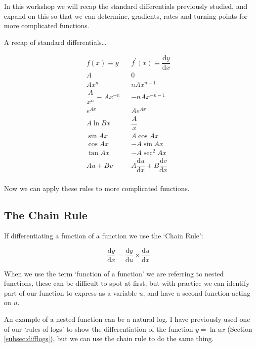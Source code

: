 \documentclass[
]{book}
\begin{document}
In this workshop we will recap the standard differentials previously studied, and expand on this so that we can determine, gradients, rates and turning points for more complicated functions.

A recap of standard differentials\ldots{}

\begin{equation*}
\begin{array}{ccc}
  f(x) \equiv y & & f^{\prime}(x) \equiv \dfrac{\textrm{d}y}{\textrm{d}x}\\
  \hline
A & &0 \\
 Ax^n & &nAx^{n-1} \\
 \dfrac{A}{x^n} \equiv A x^{-n} & &-nA x^{-n-1} \\
e^{Ax} & &Ae^{Ax} \\
A \ln Bx & &\dfrac{A}{x} \\
\sin Ax & &A\cos Ax \\
\cos Ax & &-A\sin Ax \\
\tan Ax & &-A\sec^2 Ax \\
Au + Bv & &A\dfrac{\textrm{d}u}{\textrm{d}x} + B\dfrac{\textrm{d}v}{\textrm{d}x} \\
\end{array}
\end{equation*}

Now we can apply these rules to more complicated functions.

\hypertarget{subsec:chainrule}{%
\subsection{The Chain Rule}\label{subsec:chainrule}}

If differentiating a function of a function we use the `Chain Rule':

\begin{equation}
\dfrac{\textrm{d}y}{\textrm{d}x}=\dfrac{\textrm{d}y}{\textrm{d}u} \times \dfrac{\textrm{d}u}{\textrm{d}x}
\label{eq:chainrule}
\end{equation}

When we use the term `function of a function' we are referring to nested functions, these can be difficult to spot at first, but with practice we can identify part of our function to express as a variable \(u\), and have a second function acting on \(u\).

An example of a nested function can be a natural log. I have previously used one of our `rules of logs' to show the differentiation of the function \(y = \ln ax\) (Section \ref{subsec:difflogs}), but we can use the chain rule to do the same thing.
\end{document}
